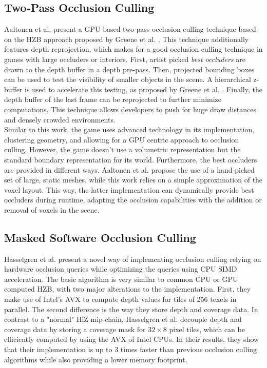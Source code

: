 \subsection*{Two-Pass Occlusion Culling}

Aaltonen et al. \cite{Aaltonen2015} present a \ac{GPU} based two-pass occlusion culling technique based on 
the \ac{HZB} approach proposed by Greene et al. \cite{Greene93,Greene95}. This technique additionally features 
depth reprojection, which makes for a good occlusion culling technique in games with large occluders or interiors. 
First, artist picked \emph{best occluders} are drawn to the depth buffer in a depth pre-pass. Then, projected 
bounding boxes can be used to test the visibility of smaller objects in the scene. A hierarchical z-buffer is 
used to accelerate this testing, as proposed by Greene et al. . Finally, the depth buffer of the last frame can 
be reprojected to further minimize computations. This technique allows developers to push for huge draw distances 
and densely crowded environments. \\

\noindent
Similar to this work, the game uses advanced technology in its implementation, clustering geometry, and allowing 
for a \ac{GPU} centric approach to occlusion culling. However, the game doesn't use a volumetric representation 
but the standard boundary representation for its world. Furthermore, the best occluders are provided in different 
ways. Aaltonen et al. \cite{Aaltonen2015} propose the use of a hand-picked set of large, static meshes, while this 
work relies on a simple approximation of the voxel layout. This way, the latter implementation can dynamically 
provide best occluders during runtime, adapting the occlusion capabilities with the addition or removal of voxels 
in the scene.


\subsection*{Masked Software Occlusion Culling}

Hasselgren et al. \cite{Hasselgren2016} present a novel way of implementing occlusion culling relying on hardware 
occlusion queries while optimizing the queries using \ac{CPU} \ac{SIMD} acceleration. The basic algorithm is very 
similar to common \ac{CPU} or \ac{GPU} computed \ac{HZB}, with two major alterations to the implementation. First, 
they make use of Intel's \ac{AVX} to compute depth values for tiles of 256 texels in parallel. The second difference 
is the way they store depth and coverage data. In contrast to a "normal" \ac{HiZ} mip-chain, Hasselgren et al. 
decouple depth and coverage data by storing a coverage mask for \begin{math}32 \times 8\end{math} pixel tiles, 
which can be efficiently computed by using the \ac{AVX} of Intel \ac{CPU}s. In their results, they show that their 
implementation is up to 3 times faster than previous occlusion culling algorithms while also providing a lower 
memory footprint. \\

